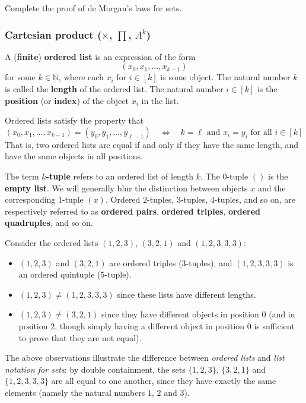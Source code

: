 \begin{exercise}
Complete the proof of de Morgan's laws for sets.
\end{exercise}

\subsubsection*{Cartesian product ($\times$, $\prod$, $A^k$)}



\begin{definition}
\label{defTuple}
A (\textbf{finite}) \textbf{ordered list} is an expression of the form
\[ (x_0, x_1, \dots, x_{k-1}) \]
for some $k \in \mathbb{N}$, where each $x_i$ for $i \in [k]$ is some object. The natural number $k$ is called the \textbf{length} of the ordered list. The natural number $i \in [k]$ is the \textbf{position} (or \textbf{index}) of the object $x_i$ in the list.

Ordered lists satisfy the property that
\[ (x_0,x_1,\dots,x_{k-1}) = (y_0,y_1,\dots,y_{\ell-1}) \quad \Leftrightarrow \quad k=\ell \text{ and } x_i=y_i \text{ for all } i \in [k] \]
That is, two ordered lists are equal if and only if they have the same length, and have the same objects in all positions.

The term \textbf{$k$-tuple} refers to an ordered list of length $k$. The $0$-tuple $()$ is the \textbf{empty list}. We will generally blur the distinction between objects $x$ and the corresponding $1$-tuple $(x)$. Ordered $2$-tuples, $3$-tuples, $4$-tuples, and so on, are respectively referred to as \textbf{ordered pairs}, \textbf{ordered triples}, \textbf{ordered quadruples}, and so on.
\end{definition}

\begin{example}
Consider the ordered lists $(1,2,3)$, $(3,2,1)$ and $(1,2,3,3,3)$:
\begin{itemize}
\item $(1,2,3)$ and $(3,2,1)$ are ordered triples ($3$-tuples), and $(1,2,3,3,3)$ is an ordered quintuple ($5$-tuple).
\item $(1,2,3) \ne (1,2,3,3,3)$ since these lists have different lengths.
\item $(1,2,3) \ne (3,2,1)$ since they have different objects in position $0$ (and in position $2$, though simply having a different object in position $0$ is sufficient to prove that they are not equal).
\end{itemize}
The above observations illustrate the difference between \textit{ordered lists} and \textit{list notation for sets}: by double containment, the sets $\{ 1, 2, 3 \}$, $\{ 3, 2, 1 \}$ and $\{ 1, 2, 3, 3, 3 \}$ are all equal to one another, since they have exactly the same elements (namely the natural numbers $1$, $2$ and $3$).
\end{example}


